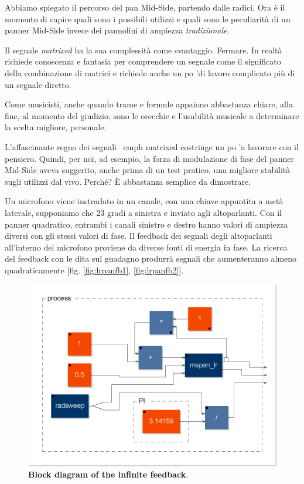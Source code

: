 Abbiamo spiegato il percorso del pan Mid-Side, partendo dalle radici. Ora è il
momento di capire quali sono i possibili utilizzi e quali sono le peculiarità di
un panner Mid-Side invece dei pannolini di ampiezza \emph{tradizionale}.

Il segnale \emph{matrixed} ha la sua complessità come svantaggio. Fermare. In
realtà richiede conoscenza e fantasia per comprendere un segnale come il
significato della combinazione di matrici e richiede anche un po 'di lavoro
complicato più di un segnale diretto.

Come musicisti, anche quando trame e formule appaiono abbastanza chiare, alla
fine, al momento del giudizio, sono le orecchie e l'usabilità musicale a
determinare la scelta migliore, personale.

L'affascinante regno dei segnali \ emph {matrixed} costringe un po 'a lavorare
con il pensiero. Quindi, per noi, ad esempio, la forza di modulazione di fase
del panner Mid-Side aveva suggerito, anche prima di un test pratico, una
migliore stabilità sugli utilizzi dal vivo. Perché? È abbastanza semplice da
dimostrare.

Un microfono viene instradato in un canale, con una chiave appuntita a metà
laterale, supponiamo che 23 gradi a sinistra e inviato agli altoparlanti. Con il
panner quadratico, entrambi i canali sinistro e destro hanno valori di ampiezza
diversi con gli stessi valori di fase. Il feedback dei segnali degli
altoparlanti all'interno del microfono proviene da diverse fonti di energia in
fase. La ricerca del feedback con le dita sul guadagno produrrà segnali che
aumenteranno almeno quadraticamente [fig. \ref{fig:lrpanfb1}, \ref{fig:lrpanfb2}].

\begin{figure}[h]
\centering
\includegraphics[width=1\columnwidth]{CAPITOLI/1000/IMG/mspanlrfb_diagram}
\caption{\textbf{Block diagram of the infinite feedback}.}
\label{fig:mspan}
\end{figure}

